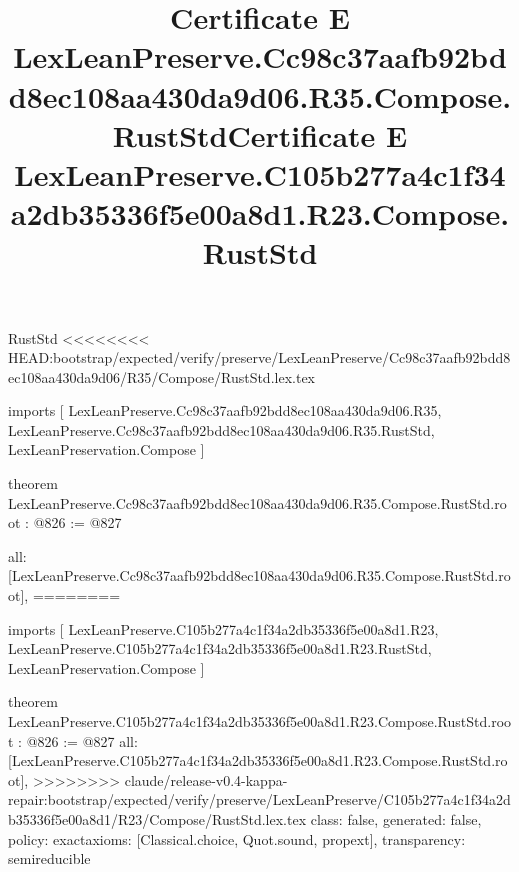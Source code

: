 \begin{lexlean}{RustStd}
<<<<<<<< HEAD:bootstrap/expected/verify/preserve/LexLeanPreserve/Cc98c37aafb92bdd8ec108aa430da9d06/R35/Compose/RustStd.lex.tex
\title{Certificate E LexLeanPreserve.Cc98c37aafb92bdd8ec108aa430da9d06.R35.Compose.RustStd}
\begin{coremodule}
imports [
  LexLeanPreserve.Cc98c37aafb92bdd8ec108aa430da9d06.R35,
  LexLeanPreserve.Cc98c37aafb92bdd8ec108aa430da9d06.R35.RustStd,
  LexLeanPreservation.Compose
]

theorem LexLeanPreserve.Cc98c37aafb92bdd8ec108aa430da9d06.R35.Compose.RustStd.root : @826 := @827 {
  all: [LexLeanPreserve.Cc98c37aafb92bdd8ec108aa430da9d06.R35.Compose.RustStd.root],
========
\title{Certificate E LexLeanPreserve.C105b277a4c1f34a2db35336f5e00a8d1.R23.Compose.RustStd}
\begin{coremodule}
imports [
  LexLeanPreserve.C105b277a4c1f34a2db35336f5e00a8d1.R23,
  LexLeanPreserve.C105b277a4c1f34a2db35336f5e00a8d1.R23.RustStd,
  LexLeanPreservation.Compose
]

theorem LexLeanPreserve.C105b277a4c1f34a2db35336f5e00a8d1.R23.Compose.RustStd.root : @826 := @827 {
  all: [LexLeanPreserve.C105b277a4c1f34a2db35336f5e00a8d1.R23.Compose.RustStd.root],
>>>>>>>> claude/release-v0.4-kappa-repair:bootstrap/expected/verify/preserve/LexLeanPreserve/C105b277a4c1f34a2db35336f5e00a8d1/R23/Compose/RustStd.lex.tex
  class: false,
  generated: false,
  policy: exact{axioms: [Classical.choice, Quot.sound, propext]},
  transparency: semireducible
}


\end{coremodule}}
\end{coremodule}
\end{lexlean}
